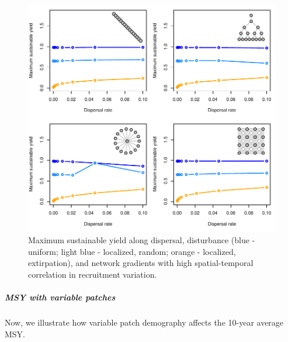\documentclass[]{article}
\let\oldsubparagraph\subparagraph
\renewcommand{\subparagraph}[1]{\oldsubparagraph{#1}\mbox{}}
\begin{document}
\begin{figure}[H]

{\centering \includegraphics{Managing_for_ecological_surprises_in_metapopulations_makeHTML_files/figure-latex/MSY-1} 

}

\caption{Maximum sustainable yield along dispersal, disturbance (blue - uniform; light blue - localized, random; orange - localized, extirpation), and network gradients with high spatial-temporal correlation in recruitment variation.}\label{fig:MSY}
\end{figure}

\hypertarget{msy-with-variable-patches}{%
\subparagraph{MSY with variable
patches}\label{msy-with-variable-patches}}

Now, we illustrate how variable patch demography affects the 10-year
average MSY.
\end{document}
